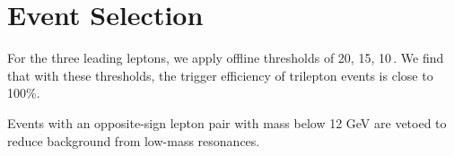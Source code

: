 \section{Event Selection}
\label{sec:Selection}

For the three leading leptons, we apply offline thresholds of 20, 15, 10\,\GeV. We find that with these thresholds, the trigger efficiency of trilepton events is close to 100\%.

Events with an opposite-sign lepton pair with mass below 12 GeV are vetoed to reduce background from low-mass resonances.
